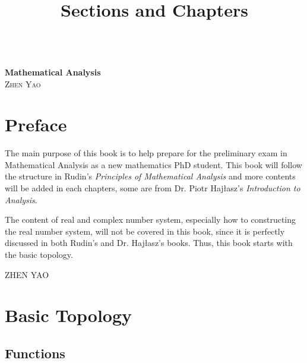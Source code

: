 \documentclass[10pt]{book}
\title{Sections and Chapters}
\theoremstyle{definition}
\numberwithin{equation}{chapter}
\begin{document}
\frontmatter

\begin{titlepage}
	\begin{center}
	\textbf{\LARGE{}} \\
	\vspace{40mm}
    \textbf{\Huge{Mathematical Analysis}} \\
    \medskip
    \vspace{10mm} %
    \large{\textsc{Zhen Yao}}\\
    \end{center}
\end{titlepage}

\tableofcontents{}
\mainmatter

\newpage

\chapter*{Preface}

The main purpose of this book is to help prepare for the preliminary exam in Mathematical Analysis as a new mathematics PhD student. This book will follow the structure in Rudin's {\it Principles of Mathematical Analysis}\cite{1} and more contents will be added in each chapters, some are from Dr. Piotr Hajłasz's {\it Introduction to Analysis}\cite{2}.

The content of real and complex number system, especially how to constructing the real number system, will not be covered in this book, since it is perfectly discussed in both Rudin's and Dr. Hajłasz's books. Thus, this book starts with the basic topology. 

\null\hfill ZHEN YAO

\newpage

\chapter{Basic Topology}

\section{Functions}
\end{document}
